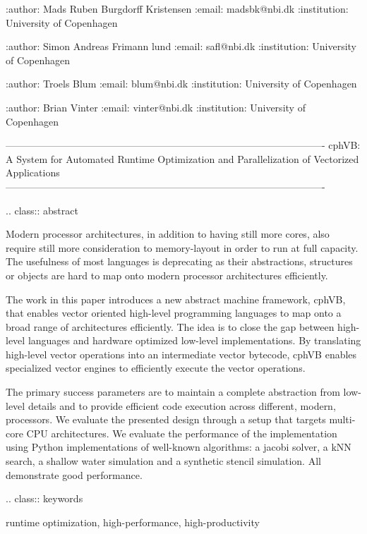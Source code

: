 :author: Mads Ruben Burgdorff Kristensen
:email: madsbk@nbi.dk
:institution: University of Copenhagen

:author: Simon Andreas Frimann lund
:email: safl@nbi.dk
:institution: University of Copenhagen

:author: Troels Blum
:email: blum@nbi.dk
:institution: University of Copenhagen

:author: Brian Vinter
:email: vinter@nbi.dk
:institution: University of Copenhagen

-------------------------------------------------------------------------------------------------
cphVB: A System for Automated Runtime Optimization and Parallelization of Vectorized Applications
-------------------------------------------------------------------------------------------------

.. class:: abstract

    Modern processor architectures, in addition to having still more cores, also require still more consideration to memory-layout in order to run at full capacity.
    The usefulness of most languages is deprecating as their abstractions, structures or objects are hard to map onto modern processor architectures efficiently.

    The work in this paper introduces a new abstract machine framework, cphVB, that enables vector oriented high-level programming languages to map onto a broad range of architectures efficiently. The idea is to close the gap between high-level languages and hardware optimized low-level implementations. By translating high-level vector operations into an intermediate vector bytecode, cphVB enables specialized vector engines to efficiently execute the vector operations.

    The primary success parameters are to maintain a complete abstraction from low-level details and to provide efficient code execution across different, modern, processors. We evaluate the presented design through a setup that targets multi-core CPU architectures. We evaluate the performance of the implementation using Python implementations of well-known algorithms: a jacobi solver, a kNN search, a shallow water simulation and a synthetic stencil simulation. All demonstrate good performance.

.. class:: keywords

   runtime optimization, high-performance, high-productivity

